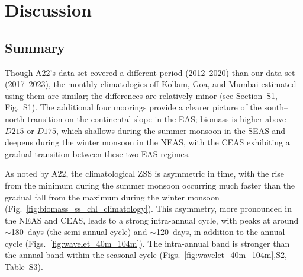 \documentclass[authoryear,review,11pt]{elsarticle}
\begin{document}


 
 

\section{Discussion}
\label{sec:discuss}

\subsection{Summary}
\label{sec:discuss.summary}

Though A22's data set covered a different period (2012--2020) than our data set (2017--2023), the monthly climatologies off Kollam, Goa, and Mumbai estimated using them are similar; the differences are relatively minor (see Section~S1, Fig.~S1).  The additional four moorings provide a clearer picture of the south--north transition on the continental slope in the EAS; biomass is higher above $D215$ or $D175$, which shallows during the summer monsoon in the SEAS and deepens during the winter monsoon in the NEAS, with the CEAS exhibiting a gradual transition between these two EAS regimes. 

As noted by A22, the climatological ZSS is asymmetric in time, with the rise from the minimum during the summer monsoon occurring much faster than the gradual fall from the maximum during the winter monsoon (Fig.~\ref{fig:biomass_ss_chl_climatology}). This asymmetry, more pronounced in the NEAS and CEAS, leads to a strong intra-annual cycle, with peaks at around $\sim$180~days (the semi-annual cycle) and $\sim$120~days, in addition to the annual cycle (Figs.~\ref{fig:wavelet_40m_104m}).  The intra-annual band is stronger than the annual band within the seasonal cycle (Figs.~\ref{fig:wavelet_40m_104m},S2, Table~S3).
\end{document}
